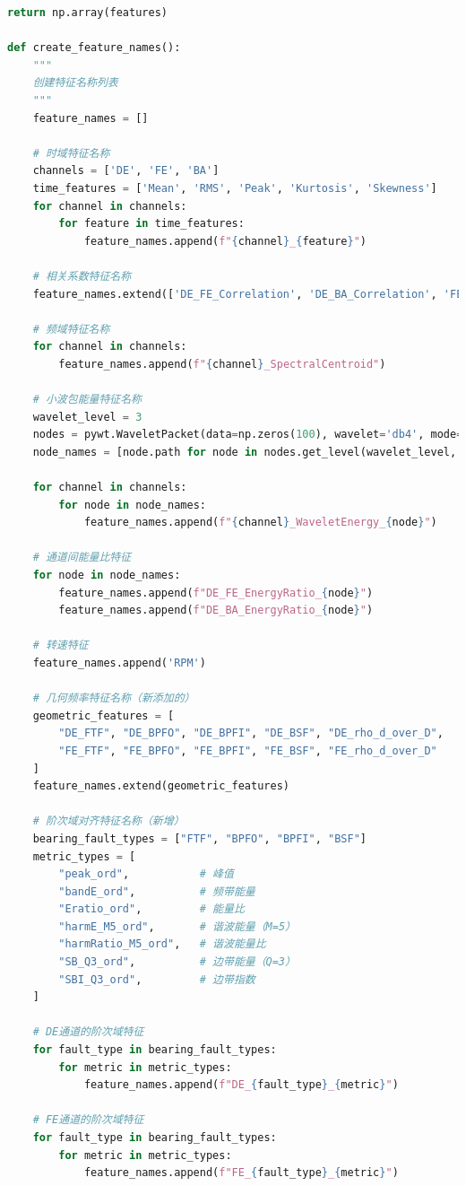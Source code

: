 \documentclass[a4paper]{CPIPC}
\numberwithin{equation}{section}
\begin{document}
\begin{lstlisting}[language=Python, caption=Feature Extraction]
    return np.array(features)

def create_feature_names():
    """
    创建特征名称列表
    """
    feature_names = []
    
    # 时域特征名称
    channels = ['DE', 'FE', 'BA']
    time_features = ['Mean', 'RMS', 'Peak', 'Kurtosis', 'Skewness']
    for channel in channels:
        for feature in time_features:
            feature_names.append(f"{channel}_{feature}")
    
    # 相关系数特征名称
    feature_names.extend(['DE_FE_Correlation', 'DE_BA_Correlation', 'FE_BA_Correlation'])
    
    # 频域特征名称
    for channel in channels:
        feature_names.append(f"{channel}_SpectralCentroid")
    
    # 小波包能量特征名称
    wavelet_level = 3
    nodes = pywt.WaveletPacket(data=np.zeros(100), wavelet='db4', mode='symmetric', maxlevel=wavelet_level)
    node_names = [node.path for node in nodes.get_level(wavelet_level, 'natural')]
    
    for channel in channels:
        for node in node_names:
            feature_names.append(f"{channel}_WaveletEnergy_{node}")
    
    # 通道间能量比特征
    for node in node_names:
        feature_names.append(f"DE_FE_EnergyRatio_{node}")
        feature_names.append(f"DE_BA_EnergyRatio_{node}")
    
    # 转速特征
    feature_names.append('RPM')
    
    # 几何频率特征名称（新添加的）
    geometric_features = [
        "DE_FTF", "DE_BPFO", "DE_BPFI", "DE_BSF", "DE_rho_d_over_D",
        "FE_FTF", "FE_BPFO", "FE_BPFI", "FE_BSF", "FE_rho_d_over_D"
    ]
    feature_names.extend(geometric_features)
    
    # 阶次域对齐特征名称（新增）
    bearing_fault_types = ["FTF", "BPFO", "BPFI", "BSF"]
    metric_types = [
        "peak_ord",           # 峰值
        "bandE_ord",          # 频带能量
        "Eratio_ord",         # 能量比
        "harmE_M5_ord",       # 谐波能量（M=5）
        "harmRatio_M5_ord",   # 谐波能量比
        "SB_Q3_ord",          # 边带能量（Q=3）
        "SBI_Q3_ord",         # 边带指数
    ]
    
    # DE通道的阶次域特征
    for fault_type in bearing_fault_types:
        for metric in metric_types:
            feature_names.append(f"DE_{fault_type}_{metric}")
    
    # FE通道的阶次域特征
    for fault_type in bearing_fault_types:
        for metric in metric_types:
            feature_names.append(f"FE_{fault_type}_{metric}")


\end{lstlisting}
\end{document}
